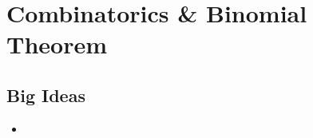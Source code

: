 \chapter{Combinatorics \& Binomial Theorem}
\label{chap:CBT}

\section{Big Ideas}
\label{sec:CBT Big Ideas}
\begin{itemize}
  \item 
\end{itemize}